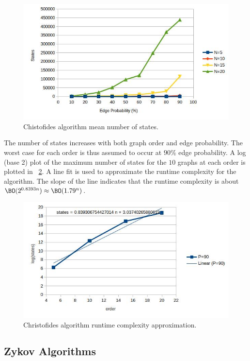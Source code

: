 \begin{figure}[H]
  \centering
  \includegraphics[width=5in]{christofides_states}
  \caption{Chistofides algorithm mean number of states.}
  \label{fig:cfstates}
\end{figure}

The number of states increases with both graph order and edge probability.  The worst case for each order is thus
assumed to occur at \(90\%\) edge probability.  A log (base 2) plot of the maximum number of states for the \(10\)
graphs at each order is plotted in \figurename~\ref{fig:cfruntime}.  A line fit is used to approximate the runtime
complexity for the algorithm.  The slope of the line indicates that the runtime complexity is about
\(\BO(2^{0.8393n})\approx\BO(1.79^n)\).

\begin{figure}[H]
  \centering
  \includegraphics[width=5in]{christofides_runtime}
  \caption{Christofides algorithm runtime complexity approximation.}
  \label{fig:cfruntime}
\end{figure}

\subsection{Zykov Algorithms}\label{sec:sub:zykov}

